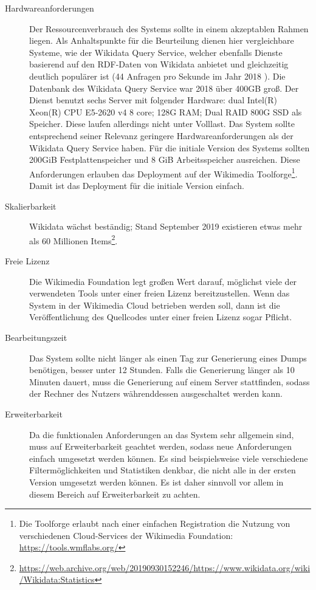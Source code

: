 \begin{description}
\item[Hardwareanforderungen] Der Ressourcenverbrauch des Systems sollte in einem akzeptablen Rahmen liegen.
    Als Anhaltspunkte für die Beurteilung dienen hier vergleichbare Systeme, wie der Wikidata Query Service, welcher ebenfalls Dienste basierend auf den RDF-Daten von Wikidata anbietet und gleichzeitig deutlich populärer ist (44 Anfragen pro Sekunde im Jahr 2018 \cite{wd-sparql}). Die Datenbank des Wikidata Query Service war 2018 über 400GB groß. Der Dienst benutzt sechs Server mit folgender Hardware: dual Intel(R) Xeon(R) CPU E5-2620 v4 8 core; 128G RAM; Dual RAID 800G SSD als Speicher. Diese laufen allerdings nicht unter Volllast.
    Das System sollte entsprechend seiner Relevanz geringere Hardwareanforderungen als der Wikidata Query Service haben. Für die initiale Version des Systems sollten 200GiB Festplattenspeicher und 8 GiB Arbeitsspeicher ausreichen. Diese Anforderungen erlauben das Deployment auf der Wikimedia Toolforge\footnote{Die Toolforge erlaubt nach einer einfachen Registration die Nutzung von verschiedenen Cloud-Services der Wikimedia Foundation: \url{https://tools.wmflabs.org/}}. Damit ist das Deployment für die initiale Version einfach.
\item[Skalierbarkeit] Wikidata wächst beständig; Stand September 2019 existieren etwas mehr als 60 Millionen Items\footnote{\url{https://web.archive.org/web/20190930152246/https://www.wikidata.org/wiki/Wikidata:Statistics}}.
\item[Freie Lizenz] Die Wikimedia Foundation legt großen Wert darauf, möglichst viele der verwendeten Tools unter einer freien Lizenz bereitzustellen\cite{wikimedia-guiding-principles}.
  Wenn das System in der Wikimedia Cloud betrieben werden soll, dann ist die Veröffentlichung des Quellcodes unter einer freien Lizenz sogar Pflicht\cite{wikimedia-cloud-tos}.
\item[Bearbeitungszeit] Das System sollte nicht länger als einen Tag zur Generierung eines Dumps benötigen, besser unter 12 Stunden. Falls die Generierung länger als 10 Minuten dauert, muss die Generierung auf einem Server stattfinden, sodass der Rechner des Nutzers währenddessen ausgeschaltet werden kann.
\item[Erweiterbarkeit] Da die funktionalen Anforderungen an das System sehr allgemein sind, muss auf Erweiterbarkeit geachtet werden, sodass neue Anforderungen einfach umgesetzt werden können. Es sind beispielsweise viele verschiedene Filtermöglichkeiten und Statistiken denkbar, die nicht alle in der ersten Version umgesetzt werden können. Es ist daher sinnvoll vor allem in diesem Bereich auf Erweiterbarkeit zu achten.

\end{description}
